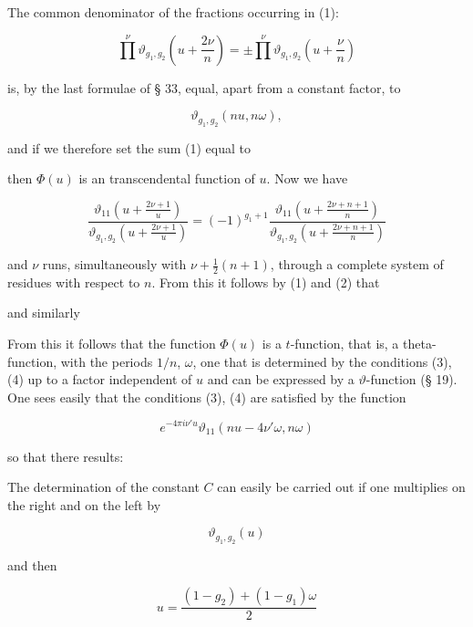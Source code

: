
The common denominator of the fractions occurring in (1):

\[
\prod^{\nu} \vartheta_{g_1,g_2}\left(u + \frac{2\nu}{n}\right) = \pm \prod^{\nu} \vartheta_{g_1,g_2}\left(u + \frac{\nu}{n}\right)
\]

is, by the last formulae of § 33, equal, apart from a constant
factor, to

\[
\vartheta_{g_1,g_2}(nu, n\omega),
\]

and if we therefore set the sum (1) equal to


then $\Phi(u)$ is an  transcendental function of $u$.
Now we have

\[
\frac{\vartheta_{11}\left(u + \frac{2\nu+1}{u}\right)}{\vartheta_{g_1,g_2}\left(u + \frac{2\nu+1}{u}\right)} = (-1)^{g_1+1} \frac{\vartheta_{11}\left(u + \frac{2\nu+n+1}{n}\right)}{\vartheta_{g_1,g_2}\left(u + \frac{2\nu+n+1}{n}\right)}
\]

and $\nu$ runs, simultaneously with $\nu + \frac{1}{2}(n+1)$, through a complete system of residues with respect to $n$. From this it follows by (1) and (2) that


and similarly


From this it follows that the function $\Phi(u)$ is a $t$-function, that is, a theta-function, %
with the periods $1/n$, $\omega$, one that is determined by the conditions (3), (4)
up to a factor independent of $u$ and can be expressed by
a $\vartheta$-function (§ 19). One sees easily that
the conditions (3), (4) are satisfied by the function

\[
e^{-4\pi i\nu' u} \vartheta_{11}(nu - 4\nu'\omega, n\omega)
\]

so that there results:


The determination of the constant $C$ can easily be carried out if one multiplies on the right and on the left by

\[
\vartheta_{g_1,g_2}(u)
\]

and then

\[
u = \frac{(1-g_2) + (1-g_1)\omega}{2}
\]
